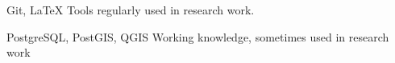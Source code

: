 
\begin{cvskills}

  \cvskill
    {\faCircle \faCircle \faCircle \faCircle \faCircleThin} %
    {Git, \LaTeX} %
    {Tools regularly used in research work.} %

  \cvskill
    {\faCircle \faCircle \faCircle \faCircleThin \faCircleThin} %
    {PostgreSQL, PostGIS, QGIS} %
    {Working knowledge, sometimes used in research work} %

\end{cvskills}